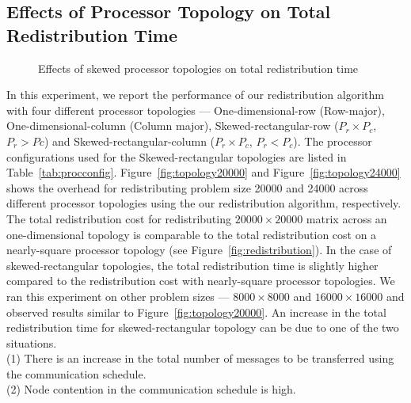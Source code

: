 \documentclass[letterpaper]{llncs}
\begin{document}
\subsection{Effects of Processor Topology on Total Redistribution Time}
\begin{figure}[ht]
\caption{Effects of skewed processor topologies on total redistribution time}
\end{figure}

\vspace{-0.02in}
In this experiment, we report the performance of our redistribution algorithm with four different processor topologies --- One-dimensional-row (Row-major), 
One-\-dim\-ensional-column (Column major), Skewed-rectangular-row ($P_r \times P_c$, $P_r >Pc$) and 
Skewed-rectangular-column ($P_r \times P_c$, $P_r < P_c$).
 The processor configurations used for the Skewed-rectangular topologies are listed in Table~\ref{tab:procconfig}.
Figure~\ref{fig:topology20000} and Figure~\ref{fig:topology24000} shows the overhead for
redistributing problem size 20000 and 24000
across different processor topologies using the our redistribution algorithm, respectively.
The total redistribution cost for redistributing $20000 \times 20000$ matrix across an one-dimensional topology is  comparable to the total redistribution cost on a nearly-square processor topology (see Figure~\ref{fig:redistribution}). 
In the case of skewed-rectangular topologies,  the  total redistribution time is slightly higher compared to the redistribution cost with nearly-square processor topologies. We ran this experiment on other problem sizes --- $8000 \times 8000$ and $16000 \times  16000$ and observed results similar to Figure~\ref{fig:topology20000}.
An increase in  the total redistribution time for skewed-rectangular topology can be due to one of the two situations. \\
(1) There is an increase in the total number of messages to be transferred using the communication schedule. \\
(2) Node contention in the communication schedule is high.\\ 
\end{document}

